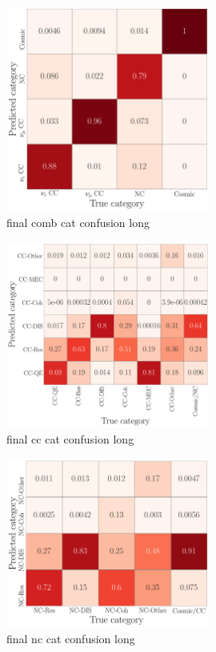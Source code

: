 \begin{figure} %
    \includegraphics[width=0.6\textwidth]{diagrams/6-cvn/chipsnet/final_comb_cat_confusion.pdf}
    \caption[final comb cat confusion short]
    {final comb cat confusion long}
    \label{fig:final_comb_cat_confusion}
\end{figure}

\begin{figure} %
    \includegraphics[width=0.6\textwidth]{diagrams/6-cvn/chipsnet/final_cc_cat_confusion.pdf}
    \caption[final cc cat confusion short]
    {final cc cat confusion long}
    \label{fig:final_cc_cat_confusion}
\end{figure}

\begin{figure} %
    \includegraphics[width=0.6\textwidth]{diagrams/6-cvn/chipsnet/final_nc_cat_confusion.pdf}
    \caption[final nc cat confusion short]
    {final nc cat confusion long}
    \label{fig:final_nc_cat_confusion}
\end{figure}

